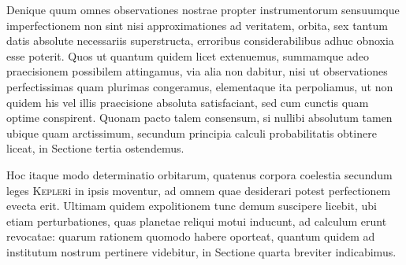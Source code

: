 Denique quum omnes observationes nostrae propter instrumentorum sensuumque imperfectionem non sint nisi approximationes ad veritatem, orbita, sex tantum datis absolute necessariis superstructa, erroribus considerabilibus adhuc obnoxia esse poterit. Quos ut quantum quidem licet extenuemus, summamque adeo praecisionem possibilem attingamus, via alia non dabitur, nisi ut observationes perfectissimas quam plurimas congeramus, elementaque ita perpoliamus, ut non quidem his vel illis praecisione absoluta satisfaciant, sed cum cunctis quam optime conspirent. Quonam pacto talem consensum, si nullibi absolutum tamen ubique quam arctissimum, secundum principia calculi probabilitatis obtinere liceat, in Sectione tertia ostendemus.

Hoc itaque modo determinatio orbitarum, quatenus corpora coelestia secundum leges \textsc{Kepler}i in ipsis moventur, ad omnem quae desiderari potest perfectionem evecta erit. Ultimam quidem expolitionem tunc demum suscipere licebit, ubi etiam perturbationes, quas planetae reliqui motui inducunt, ad calculum erunt revocatae: quarum rationem quomodo habere oporteat, quantum quidem ad institutum nostrum pertinere videbitur, in Sectione quarta breviter indicabimus.
